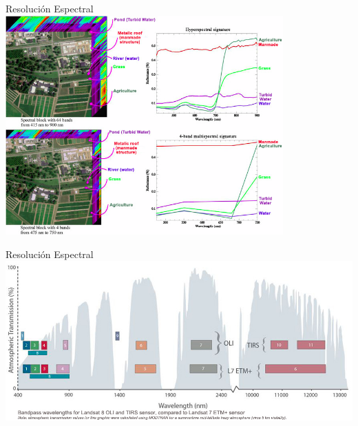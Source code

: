 \documentclass{beamer}
\begin{document}
\begin{frame}{Resolución Espectral}
	\centering
	\includegraphics[width=0.8\textwidth]{IMGs/res_spectral2}
\end{frame}

\begin{frame}{Resolución Espectral}
	\includegraphics[width=1\textwidth]{IMGs/res_spectral}
\end{frame}
\end{document}
